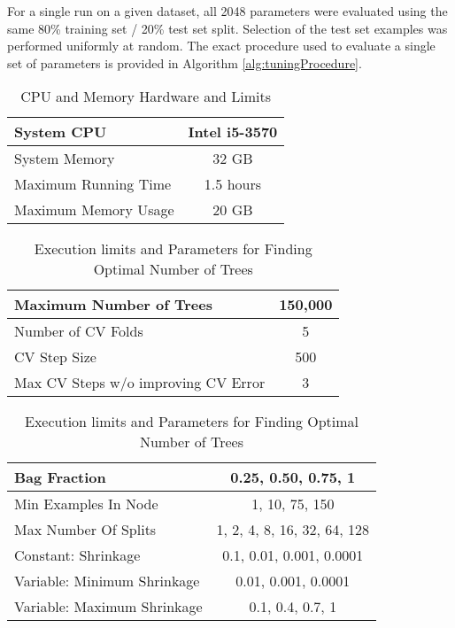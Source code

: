 \documentclass[9pt, conference]{IEEEtran}
\begin{document}
For a single run on a given dataset, all 2048 parameters were evaluated using the same 80\% training set / 20\% test set split. Selection of the test set examples was performed uniformly at random. The exact procedure used to evaluate a single set of parameters is provided in Algorithm \ref{alg:tuningProcedure}.
\begin{table}
	\centering
	\begin{tabular}{ | l || c |}
		\hline
		\rule{0pt}{2ex} System CPU & Intel i5-3570 \\ \hline
		\rule{0pt}{2ex} System Memory & 32 GB \\ \hline
		\rule{0pt}{2ex} Maximum Running Time & 1.5 hours \\ \hline
		\rule{0pt}{2ex} Maximum Memory Usage & 20 GB \\ \hline
	\end{tabular}
	\caption{CPU and Memory Hardware and Limits}
	\label{tab:executionLimits}
\end{table}
\begin{table}
	\centering
	\begin{tabular}{ | l || c |}
	\hline
	\rule{0pt}{2ex}	Maximum Number of Trees & 150,000 \\ \hline
	\rule{0pt}{2ex}	Number of CV Folds & 5 \\ \hline
	\rule{0pt}{2ex}	CV Step Size & 500 \\ \hline
	\rule{0pt}{2ex}	Max CV Steps w/o improving CV Error	& 3 \\ \hline
	\end{tabular}
	\caption{Execution limits and Parameters for Finding Optimal Number of Trees}
	\label{tab:findOptTreeParam}
\end{table}
\begin{table}
	\centering
		\begin{tabular}	{ | l || c |}
			\hline
			Bag Fraction & 0.25, 0.50, 0.75, 1 \\ \hline
			Min Examples In Node & 1, 10, 75, 150 \\ \hline
			Max Number Of Splits & 1, 2, 4, 8, 16, 32, 64, 128 \\ \hline
			Constant: Shrinkage & 0.1, 0.01, 0.001, 0.0001 \\ \hline
			Variable: Minimum Shrinkage & 0.01, 0.001, 0.0001 \\ \hline
			Variable: Maximum Shrinkage & 0.1, 0.4, 0.7, 1 \\
			\hline
			
		\end{tabular}
		\caption{Execution limits and Parameters for Finding Optimal Number of Trees}
		\label{tab:parameters}
\end{table}
\end{document}

